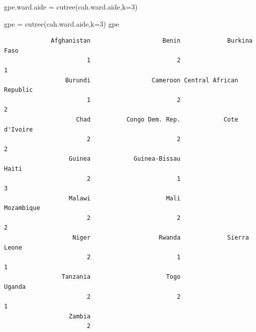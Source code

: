 \documentclass[
]{article}
\newenvironment{Shaded}{}{}
\newcommand{\AttributeTok}[1]{#1}
\newcommand{\DecValTok}[1]{#1}
\newcommand{\FunctionTok}[1]{#1}
\newcommand{\NormalTok}[1]{#1}
\newcommand{\OtherTok}[1]{\textcolor[rgb]{1.00,0.25,0.00}{#1}}
\newcommand{\SpecialCharTok}[1]{\textcolor[rgb]{0.00,0.50,0.50}{#1}}
\begin{document}
\begin{Shaded}
\begin{Highlighting}[]
\NormalTok{gpe.ward.aide }\OtherTok{=} \FunctionTok{cutree}\NormalTok{(cah.ward.aide,}\AttributeTok{k=}\DecValTok{3}\NormalTok{)}
\end{Highlighting}
\end{Shaded}

\begin{Shaded}
\begin{Highlighting}[]
\NormalTok{gpe }\OtherTok{=} \FunctionTok{cutree}\NormalTok{(cah.ward.aide,}\AttributeTok{k=}\DecValTok{3}\NormalTok{)}
\NormalTok{gpe}
\end{Highlighting}
\end{Shaded}

\begin{verbatim}
             Afghanistan                    Benin             Burkina Faso 
                       1                        2                        1 
                 Burundi                 Cameroon Central African Republic 
                       1                        2                        2 
                    Chad          Congo Dem. Rep.            Cote d'Ivoire 
                       2                        2                        2 
                  Guinea            Guinea-Bissau                    Haiti 
                       2                        1                        3 
                  Malawi                     Mali               Mozambique 
                       2                        2                        2 
                   Niger                   Rwanda             Sierra Leone 
                       2                        1                        1 
                Tanzania                     Togo                   Uganda 
                       2                        2                        1 
                  Zambia 
                       2 
\end{verbatim}

\begin{Shaded}
\end{Shaded}
\end{document}
